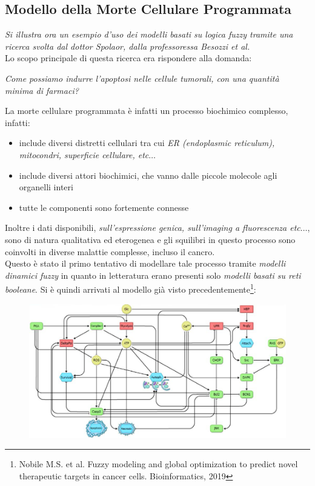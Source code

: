 \documentclass[a4paper,12pt, oneside]{book}
\begin{document}
\subsection{Modello della Morte Cellulare Programmata}
\textit{Si illustra ora un esempio d'uso dei modelli basati su logica fuzzy
  tramite una ricerca svolta dal dottor Spolaor, dalla professoressa Besozzi et
  al.}\\
Lo scopo principale di questa ricerca era rispondere alla domanda:
\begin{center}
  \textit{Come possiamo indurre l'apoptosi nelle cellule tumorali, con una
    quantità minima di farmaci?} 
\end{center}
La morte cellulare programmata è infatti un processo biochimico complesso,
infatti:
\begin{itemize}
  \item include diversi distretti cellulari tra cui \textit{ER (endoplasmic
    reticulum), mitocondri, 
    superficie cellulare, etc}$\ldots$
  \item include diversi attori biochimici, che vanno dalle piccole molecole agli
  organelli interi
  \item tutte le componenti sono fortemente connesse
\end{itemize}
Inoltre i dati disponibili, \textit{sull'espressione genica, sull'imaging a
  fluorescenza etc$\ldots$}, sono di natura qualitativa ed eterogenea e
gli squilibri in questo processo sono coinvolti in diverse malattie complesse,
incluso il cancro.\\
Questo è stato il primo tentativo di modellare tale processo tramite
\textit{modelli dinamici fuzzy} in quanto in letteratura erano presenti solo
\textit{modelli basati su reti booleane}.
\newpage
\noindent
Si è quindi arrivati al modello già
visto precedentemente\footnote{Nobile M.S. et al. Fuzzy modeling and global
  optimization to predict novel therapeutic 
  targets in cancer cells. Bioinformatics, 2019}: 
\begin{figure}[H]
  \centering
  \includegraphics[scale = 1.60]{img/fuz1.jpg}
\end{figure}
\end{document}
